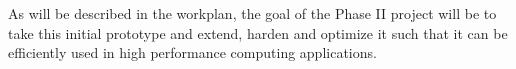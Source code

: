 As will be described in the workplan, the goal of the Phase II project will be to take this initial prototype and extend, harden and 
optimize it such that it can be efficiently used in high performance computing applications. 





























